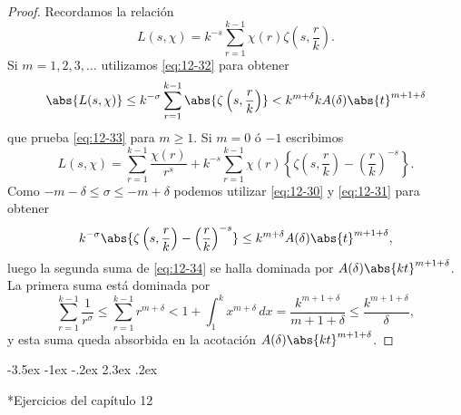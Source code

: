 \documentclass[12pt,a4paper]{book}
\makeatletter
\renewcommand\section{\@startsection{section}{1}{\z@}%
  {-3.5ex \@plus -1ex \@minus -.2ex}%
  {2.3ex \@plus .2ex}%
  {\normalfont\Large\bfseries\raggedright}}
\makeatother
\begin{document}
    \begin{proof}
        Recordamos la relación
        \begin{equation*}
            L(s,\chi)=k^{-s}\sum_{r=1}^{k-1}\chi(r)\zeta\left(s,\frac{r}{k}\right).
        \end{equation*}
        Si $m=1,2,3,\dots$ utilizamos \eqref{eq:12-32} para obtener
        \begin{equation*}
            \abs{L(s,\chi)}\leq k^{-\sigma}\sum_{r=1}^{k-1}\abs{\zeta\left(s,\frac{r}{k}\right)}<k^{m+\delta}kA(\delta)\abs{t}^{m+1+\delta}
        \end{equation*}
        que prueba \eqref{eq:12-33} para $m\geq1$. Si $m=0$ ó $-1$ escribimos
        \begin{equation}\label{eq:12-34}
            L(s,\chi)=\sum_{r=1}^{k-1}\frac{\chi(r)}{r^{s}}+k^{-s}\sum_{r=1}^{k-1}\chi(r)\left\{\zeta\left(s,\frac{r}{k}\right)-\left(\frac{r}{k}\right)^{-s}\right\}.
        \end{equation}
        Como $-m-\delta\leq\sigma\leq-m+\delta$ podemos utilizar \eqref{eq:12-30} y
        \eqref{eq:12-31} para obtener
        \begin{equation*}
            k^{-\sigma}\abs{\zeta\left(s,\frac{r}{k}\right)-\left(\frac{r}{k}\right)^{-s}}\leq k^{m+\delta}A(\delta)\abs{t}^{m+1+\delta},
        \end{equation*}
        luego la segunda suma de \eqref{eq:12-34} se halla dominada por
        $A(\delta)\abs{kt}^{m+1+\delta}$. La primera suma está dominada por
        \begin{equation*}
            \sum_{r=1}^{k-1}\frac{1}{r^{\sigma}}\leq\sum_{r=1}^{k-1}r^{m+\delta}<1+\int_{1}^{k}x^{m+\delta}\,dx=\frac{k^{m+1+\delta}}{m+1+\delta}\leq\frac{k^{m+1+\delta}}{\delta},
        \end{equation*}
        y esta suma queda absorbida en la acotación $A(\delta)\abs{kt}^{m+1+\delta}$.
    \end{proof}

    \section*{Ejercicios del capítulo 12}
\end{document}
